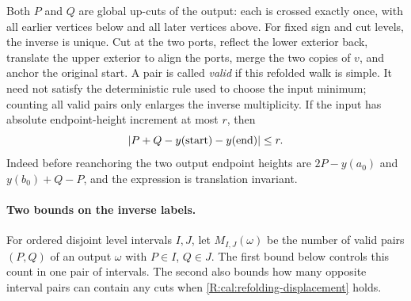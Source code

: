 Both $P$ and $Q$ are global up-cuts of the output: each is crossed
exactly once, with all earlier vertices below and all later vertices
above. For fixed sign and cut levels, the inverse is unique. Cut at the
two ports, reflect the lower exterior back, translate the upper exterior
to align the ports, merge the two copies of $v$, and anchor the original
start. A pair is called \emph{valid} if this refolded walk is simple.
It need not satisfy the deterministic rule used to choose the input
minimum; counting all valid pairs only enlarges the inverse multiplicity.
If the input has absolute endpoint-height increment at most $r$, then
\begin{equation}
 |P+Q-y({\rm start})-y({\rm end})|\le r.
 \label{R:cal:refolding-displacement}
\end{equation}
Indeed before reanchoring the two output endpoint heights are
$2P-y(a_0)$ and $y(b_0)+Q-P$, and the expression is translation invariant.

\paragraph{Two bounds on the inverse labels.}
For ordered disjoint level intervals $I,J$, let $M_{I,J}(\omega)$ be
the number of valid pairs $(P,Q)$ of an output $\omega$ with
$P\in I$, $Q\in J$. The first bound below controls this count in one
pair of intervals. The second also bounds how many opposite interval
pairs can contain any cuts when \eqref{R:cal:refolding-displacement}
holds.

